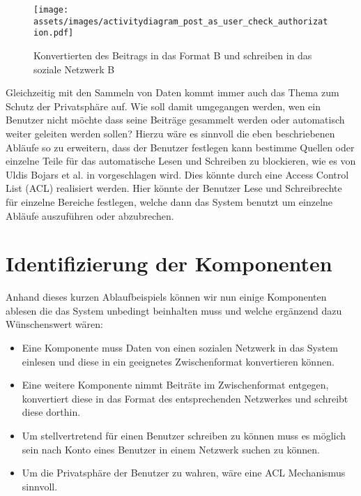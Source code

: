 \medskip

\begin{figure}[ht]
     \texttt{[image: assets/images/activitydiagram\_post\_as\_user\_check\_authorization.pdf]}
    \caption{
        Konvertierten des Beitrags in das Format B und schreiben in das soziale Netzwerk B
    }
    \label{fig:konvertieren_formatb_und_schreiben}
\end{figure}

Gleichzeitig mit den Sammeln von Daten kommt immer auch das Thema zum Schutz der Privatsphäre auf. Wie soll damit umgegangen werden, wen ein Benutzer nicht möchte dass seine Beiträge gesammelt werden oder automatisch weiter geleiten werden sollen? Hierzu wäre es sinnvoll die eben beschriebenen Abläufe so zu erweitern, dass der Benutzer festlegen kann bestimme Quellen oder einzelne Teile für das automatische Lesen und Schreiben zu blockieren, wie es von Uldis Bojars et al. in \cite{Bojars2011} vorgeschlagen wird. Dies könnte durch eine Access Control List (ACL) realisiert werden. Hier könnte der Benutzer Lese und Schreibrechte für einzelne Bereiche festlegen, welche dann das System benutzt um einzelne Abläufe auszuführen oder abzubrechen.


\section{Identifizierung der Komponenten} %
\label{sec:identifizierung_der_komponenten}

Anhand dieses kurzen Ablaufbeispiels können wir nun einige Komponenten ablesen die das System unbedingt beinhalten muss und welche ergänzend dazu Wünschenswert wären:

\begin{itemize} 
    \item Eine Komponente muss Daten von einen sozialen Netzwerk in das System einlesen und diese in ein geeignetes Zwischenformat konvertieren können.
    \item Eine weitere Komponente nimmt Beiträte im Zwischenformat entgegen, konvertiert diese in das Format des entsprechenden Netzwerkes und schreibt diese dorthin.
    \item Um stellvertretend für einen Benutzer schreiben zu können muss es möglich sein nach Konto eines Benutzer in einem Netzwerk suchen zu können.
    \item Um die Privatsphäre der Benutzer zu wahren, wäre eine ACL Mechanismus sinnvoll.
\end{itemize}   


